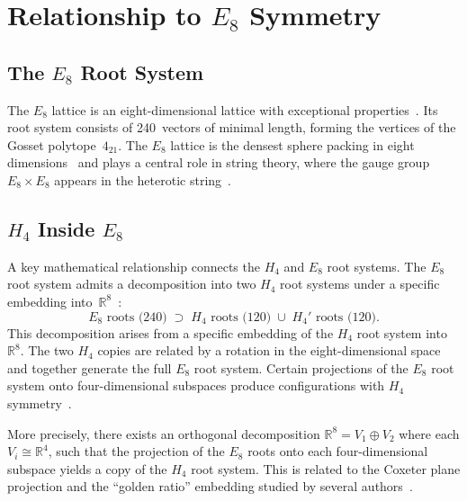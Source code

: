 \documentclass[12pt,a4paper]{article}
\newcommand{\Hfour}{H_4}
\newcommand{\Eeight}{E_8}
\newcommand{\R}{\mathbb{R}}
\begin{document}
\section{Relationship to \texorpdfstring{$\Eeight$}{E8} Symmetry}
\label{sec:e8}

\subsection{The \texorpdfstring{$\Eeight$}{E8} Root System}

The $\Eeight$ lattice is an eight-dimensional lattice with exceptional
properties~\cite{conway1999e8}.  Its root system consists of 240~vectors of
minimal length, forming the vertices of the Gosset polytope~$4_{21}$.  The
$\Eeight$ lattice is the densest sphere packing in eight
dimensions~\cite{viazovska2017} and plays a central role in string theory,
where the gauge group $\Eeight \times \Eeight$ appears in the heterotic
string~\cite{gross1985}.

\subsection{\texorpdfstring{$\Hfour$}{H4} Inside \texorpdfstring{$\Eeight$}{E8}}

A key mathematical relationship connects the $\Hfour$ and $\Eeight$ root
systems.  The $\Eeight$ root system admits a decomposition into two $\Hfour$ root
systems under a specific embedding into~$\R^8$~\cite{moody1984,sadoc1999}:
\begin{equation}\label{eq:e8_decomp}
  \Eeight\text{ roots (240)}
  \;\supset\;
  \Hfour\text{ roots (120)}
  \;\cup\;
  \Hfour'\text{ roots (120)}.
\end{equation}
This decomposition arises from a specific embedding of the $\Hfour$ root
system into~$\R^8$.  The two $\Hfour$ copies are related by a rotation in the
eight-dimensional space and together generate the full $\Eeight$ root system.
Certain projections of the $\Eeight$ root system onto four-dimensional
subspaces produce configurations with $\Hfour$
symmetry~\cite{moody1984}.

More precisely, there exists an orthogonal decomposition
$\R^8 = V_1 \oplus V_2$ where each $V_i \cong \R^4$, such that the projection
of the $\Eeight$ roots onto each four-dimensional subspace yields a copy of
the $\Hfour$ root system.  This is related to the Coxeter plane projection and
the ``golden ratio'' embedding studied by several
authors~\cite{sadoc1999,chen1998}.
\end{document}
